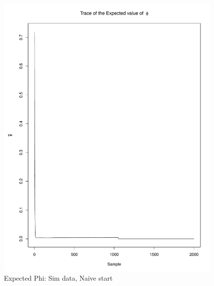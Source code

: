 \documentclass[11pt]{labbook}
\begin{document}
    \begin{figure}
        \centering
        \includegraphics[scale=.65]{FONSE_Plots/2016/October_17/simulated_naive_expectedPhi}
        \caption{Expected Phi: Sim data, Naive start}
        \label{fig:OCT17_S.N.EPHI}
    \end{figure}
\end{document}
